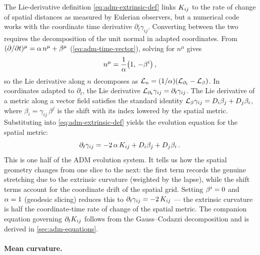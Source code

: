 The Lie-derivative definition \cref{eq:adm-extrinsic-def} links
$K_{ij}$ to the rate of change of spatial distances as measured by
Eulerian observers, but a numerical code works with the coordinate time
derivative $\partial_t\gamma_{ij}$.  Converting between the two requires
the decomposition of the unit normal in adapted coordinates.  From
$(\partial/\partial t)^\mu = \alpha\,n^\mu + \beta^\mu$
(\cref{eq:adm-time-vector}), solving for $n^\mu$ gives
%
\begin{equation}
  n^\mu = \frac{1}{\alpha}\bigl(1,\,-\beta^{i}\bigr) \,,
  \label{eq:adm-normal-adapted}
\end{equation}
%
so the Lie derivative along $n$ decomposes as
$\mathcal{L}_{n} = (1/\alpha)(\mathcal{L}_{\partial_t} - \mathcal{L}_{\beta})$.  In coordinates
adapted to $\partial_t$, the Lie derivative
$\mathcal{L}_{\partial_t}\gamma_{ij} = \partial_t\gamma_{ij}$.  The Lie
derivative of a metric along a vector field satisfies the standard
identity $\mathcal{L}_{\beta}\gamma_{ij} = D_i\beta_j + D_j\beta_i$, where
$\beta_i = \gamma_{ij}\,\beta^j$ is the shift with its index lowered by
the spatial metric.  Substituting into \cref{eq:adm-extrinsic-def}
yields the evolution equation for the spatial metric:
%
\begin{equation}
  \partial_t \gamma_{ij}
  = -2\,\alpha\,K_{ij}
    + D_i\beta_j + D_j\beta_i \,.
  \label{eq:adm-metric-evolution}
\end{equation}
%
This is one half of the ADM evolution system.  It tells us how the
spatial geometry changes from one slice to the next: the first term
records the genuine stretching due to the extrinsic curvature
(weighted by the lapse), while the shift terms account for the
coordinate drift of the spatial grid.  Setting $\beta^{i} = 0$ and
$\alpha = 1$ (geodesic slicing) reduces this to
$\partial_t\gamma_{ij} = -2\,K_{ij}$ --- the extrinsic curvature is
half the coordinate-time rate of change of the spatial metric.  The
companion equation governing $\partial_t K_{ij}$ follows from the
Gauss--Codazzi decomposition and is derived in \cref{sec:adm-equations}.

\paragraph{Mean curvature.}

